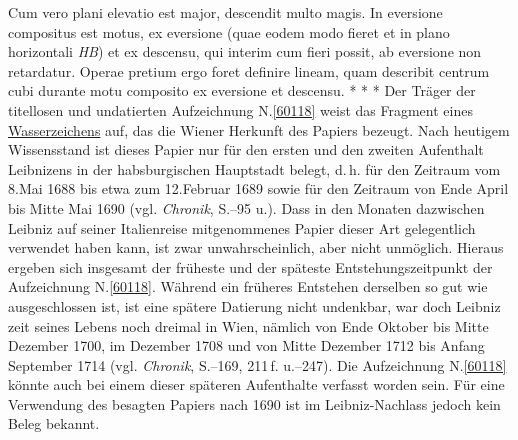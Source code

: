 Cum vero plani elevatio%
est major,
descendit multo
magis.%
%
\pend%
\pstart%
\ledpb%
In eversione compositus est motus,%
ex eversione %
(quae eodem modo fieret et in plano horizontali \textit{HB})%
et ex descensu,%
qui interim
cum fieri possit,
ab eversione%
non retardatur.
\pend%
\pstart%
Operae pretium ergo foret definire lineam,
quam describit centrum cubi%
durante motu composito ex eversione et descensu.%
\pend
\vspace{5.0em}%
\pstart%
\noindent%
\centering%
*     *     *
\pend%
\vspace{5.0em}%
%
\frenchspacing%
\footnotesize%
\pstart%
\noindent%
%
Der Träger der titellosen und undatierten Aufzeichnung N.\;\ref{60118} weist das Fragment eines \href{\Scan{LH_35_10_14_012wz}}{Wasserzeichens} auf, das die Wiener Herkunft des Papiers bezeugt. %
Nach heutigem Wissensstand ist dieses Papier nur für den ersten und den zweiten Aufenthalt Leibnizens in der habsburgischen Hauptstadt belegt, d.\,h. für den Zeitraum vom 8.\;Mai 1688 bis etwa zum 12.\;Februar 1689 sowie für den Zeitraum von Ende April bis Mitte Mai 1690 (vgl. \textit{Chronik}, S.--95 u.).\cite{01236} 
Dass in den Monaten dazwischen Leibniz auf seiner Italienreise mitgenommenes Papier dieser Art gelegentlich verwendet haben kann, ist zwar unwahrscheinlich, aber nicht unmöglich.
Hieraus ergeben sich insgesamt der früheste und der späteste Entstehungszeitpunkt der Aufzeichnung N.\;\ref{60118}.
\pend%
\pstart%
Während ein früheres Entstehen derselben %
so gut wie ausgeschlossen ist, ist eine spätere Datierung nicht undenkbar, war doch Leibniz zeit seines Lebens noch dreimal in Wien, nämlich von Ende Oktober bis Mitte Dezember 1700, im Dezember 1708 und von Mitte Dezember 1712 bis Anfang September 1714 (vgl. \textit{Chronik}, S.--169, 211\,f. u.--247).\cite{01236}
Die Aufzeichnung N.\;\ref{60118} könnte auch bei einem dieser späteren Aufenthalte verfasst worden sein.
Für eine Verwendung des besagten Papiers nach 1690 ist im Leibniz-Nachlass jedoch kein Beleg bekannt.
\pend%
%
\frenchspacing%
\normalsize%
